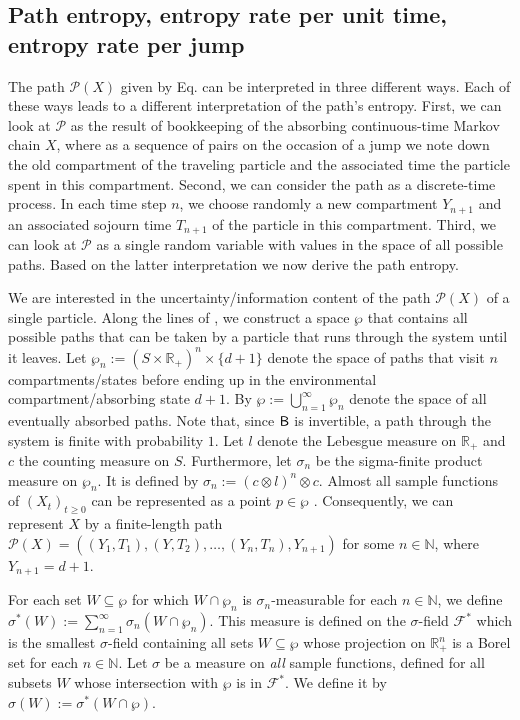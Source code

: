 \documentclass[smallextended]{svjour3}
\makeatletter
\renewcommand*{\eqref}[1]{%
  \hyperref[{#1}]{\textup{\tagform@{\ref*{#1}}}}%
}
\newcommand{\R}{\mathbb{R}}
\newcommand{\N}{\mathbb{N}}
\makeatother
\begin{document}
\subsection{Path entropy, entropy rate per unit time, entropy rate per jump}
\label{sec:path_entropy}
The path $\mathcal{P}(X)$ given by Eq. \eqref{eqn:path} can be interpreted in three different ways.
Each of these ways leads to a different interpretation of the path's entropy.
First, we can look at $\mathcal{P}$ as the result of bookkeeping of the absorbing continuous-time Markov chain $X$, where as a sequence of pairs on the occasion of a jump we note down the old compartment of the traveling particle and the associated time the particle spent in this compartment.
Second, we can consider the path as a discrete-time process.
In each time step $n$, we choose randomly a new compartment $Y_{n+1}$ and an associated sojourn time $T_{n+1}$ of the particle in this compartment.
Third, we can look at $\mathcal{P}$ as a single random variable with values in the space of all possible paths.
Based on the latter interpretation we now derive the path entropy.

We are interested in the uncertainty/information content of the path $\mathcal{P}(X)$ of a single particle.
Along the lines of \citet{Albert1962AMS}, we construct a space $\wp$ that contains all possible paths that can be taken by a particle that runs through the system until it leaves.
Let $\wp_n:=(S\times\R_+)^n\times\{d+1\}$ denote the space of paths that visit $n$ compartments/states before ending up in the environmental compartment/absorbing state $d+1$.
By $\wp:=\bigcup_{n=1}^{\infty}\wp_n$ denote the space of all eventually absorbed paths.
Note that, since $\mathsf{B}$ is invertible, a path through the system is finite with probability $1$.
Let $l$ denote the Lebesgue measure on $\R_+$ and $c$ the counting measure on $S$.
Furthermore, let $\sigma_n$ be the sigma-finite product measure on $\wp_n$.
It is defined by $\sigma_n:=(c\otimes l)^n \otimes c$.
Almost all sample functions of $(X_t)_{t\geq0}$ can be represented as a point $p\in\wp$ \citep[Chapter~VI]{Doob1953}.
Consequently, we can represent $X$ by a finite-length path $\mathcal{P}(X)=((Y_1,T_1),(Y,T_2),\ldots,(Y_n,T_n),Y_{n+1})$ for some $n\in\N$, where $Y_{n+1}=d+1$.

For each set $W\subseteq\wp$ for which $W\cap \wp_n$ is $\sigma_n$-measurable for each $n\in\N$, we define $\sigma^\ast(W) := \sum_{n=1}^{\infty} \sigma_n(W\cap\wp_n)$.
This measure is defined on the $\sigma$-field $\mathcal{F}^\ast$ which is the smallest $\sigma$-field containing all sets $W\subseteq\wp$ whose projection on $\R^n_+$ is a Borel set for each $n\in\N$.
Let $\sigma$ be a measure on \emph{all} sample functions, defined for all subsets $W$ whose intersection with $\wp$ is in $\mathcal{F}^\ast$. 
We define it by $\sigma(W):=\sigma^*(W\cap\wp)$.
\end{document}
